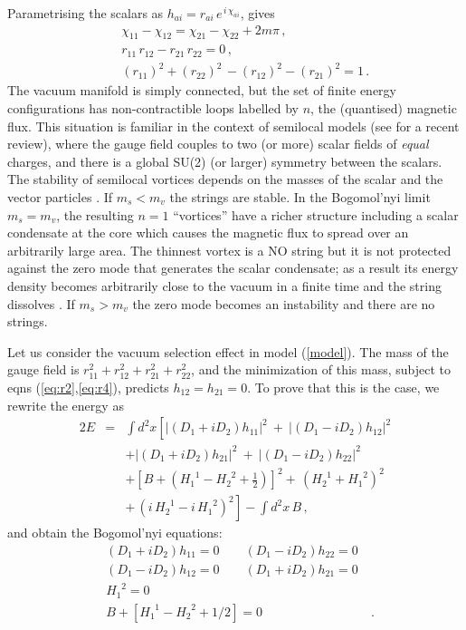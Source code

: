 \documentclass[a4paper,aps,prd,superscriptaddress,floats]{revtex4}
\begin{document}
Parametrising the scalars  as $
 h_{ai} = r_{ai}\, e^{\,i\,\chi_{ai}}$, gives
\begin{eqnarray} 
 & &\chi_{11}-\chi_{12}=\chi_{21}-\chi_{22}+2m\pi\,,\\
& &r_{11}\,r_{12} - r_{21}\,r_{22} =  0 \,,\label{eq:r2} \\ 
 & &(r_{11})^2 + (r_{22})^2 \, - (r_{12})^2 - (r_{21})^2  =  1\,.\label{eq:r4}
\end{eqnarray}
The vacuum manifold is simply 
connected, but the set of finite energy configurations has 
non-contractible loops labelled by $n$,
the (quantised) magnetic flux. This situation is familiar in the context
of semilocal models (see \cite{AV00} for a recent review), where
the gauge field couples to two (or more) scalar fields of {\it equal} charges,
and there is a global SU(2) (or larger) symmetry between the scalars.
The stability of semilocal vortices depends on the masses 
of the scalar and
the vector particles \cite{H92}. If $m_s < m_v$ the strings are stable. 
In the Bogomol'nyi limit $m_s=m_v$, 
the resulting  $n=1$ ``vortices'' have a richer structure including a 
scalar condensate at the core which causes the magnetic flux 
to spread  over an arbitrarily large area. The thinnest vortex 
is a NO string but it is not protected against 
the zero mode that generates the  scalar condensate; as a result its 
energy density becomes arbitrarily close to the vacuum in a finite time
and the string dissolves \cite{leese}.
If $m_s>m_v$ the zero mode becomes an instability and there are no strings.


Let us consider the vacuum selection effect in model (\ref{model}).
The mass of the gauge field is $r_{11}^2 + r_{12}^2 + 
r_{21}^2 + r_{22}^2 $, and the minimization of this mass, subject to eqns (\ref{eq:r2},\ref{eq:r4}), 
predicts $h_{12} = h_{21} = 0$. 
To prove that this is the case, we rewrite the energy as 
\begin{eqnarray}
2E&=& \int d^2x\left[ 
|(D_1+iD_2) h_{11}|^2 \ + \  |(D_1-iD_2)h_{12}|^2
\right. \nonumber\\
& &+  |(D_1+iD_2) h_{21}|^2 \ + \ |(D_1-iD_2)h_{22}|^2
\nonumber\\
& &+  [ B +  (H^{\;\;1}_1 - H^{\;\;2}_2 + \frac12)]^2 + \,(H^{\;\;1}_2 
+ H^{\;\;2}_1)^2\nonumber\\
& &+\left.  \, (i\,H^{\;\;1}_2 - i\,H^{\;\;2}_1)^2\right] - \int d^2x\, B \,,
\end{eqnarray}
and obtain the Bogomol'nyi equations:
\begin{eqnarray}
&(D_1+iD_2) h_{11} = 0 \qquad (D_1-iD_2)h_{22} = 0& \label{22}\\
&(D_1-iD_2)h_{12}  = 0 \qquad (D_1+iD_2) h_{21} = 0& \label{21} \\
&H^{\;\;2}_1 =  0 &\label{H21}\\
&B +  \left[H^{\;\;1}_1 - H^{\;\;2}_2 + 1/2\right] = 0 & \ . \label{Beq} 
\end{eqnarray}
\end{document}
